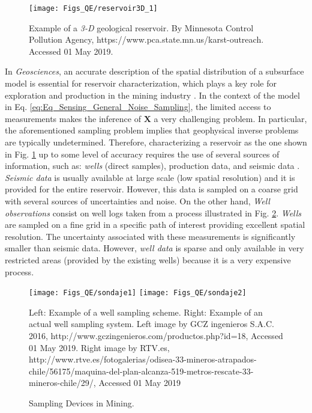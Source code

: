 		\begin{figure}[H]
		\centering
		\texttt{[image: Figs\_QE/reservoir3D\_1]}

		\caption[Example of a \emph{3-D} geological reservoir.]{Example of a \emph{3-D} geological reservoir. By Minnesota Control Pollution Agency, https://www.pca.state.mn.us/karst-outreach. Accessed 01 May 2019.}
		\label{fig:example3Dreservoir}
		\end{figure}
		
In \textit{Geosciences}, an accurate description of the spatial distribution of a subsurface model is essential for reservoir characterization, which plays a key role for %
exploration and production in the mining industry \citep{Oliver_2008_a,Onwunalu09,GuyagulerBaris2002_a,Bangerth_2005,Krause_2006,Bangerth_2006}. In the context of the model in Eq. \eqref{eq:Eq_Sensing_General_Noise_Sampling}, the limited access to measurements makes the inference of $\mathbf{X}$ a very challenging problem. In particular, the aforementioned sampling problem implies that geophysical inverse problems are typically undetermined. Therefore, characterizing a reservoir as the one shown in Fig. \ref{fig:example3Dreservoir} up to some level of accuracy requires the use of several sources of information, such as: \emph{wells} (direct samples), production data, and seismic data \citep{Oliver_2008_a,GuyagulerBaris2002_a,Krause_2008b,olea1984_a}. \emph{Seismic data} is usually available at large scale (low spatial resolution) and it is provided for the entire reservoir. However, this data is sampled on a coarse grid with several sources of uncertainties and noise. On the other hand, \emph{Well observations} consist on well logs taken from a process illustrated in Fig. \ref{fig:samplingWell}. \emph{Wells} are sampled on a fine grid in a specific path of interest providing excellent spatial resolution. The uncertainty associated with these measurements is significantly smaller than seismic data. However, \emph{well data} is sparse and only available in very restricted areas (provided by the existing wells) because it is a very expensive process. 


		\begin{figure}[H]
		\centering
		\texttt{[image: Figs\_QE/sondaje1]}
		\texttt{[image: Figs\_QE/sondaje2]}

		\caption[Sampling Devices in Mining.]{Sampling Devices in Mining.}
		\scriptsize{Left: Example of a well sampling scheme. Right: Example of an actual well sampling system. Left image by GCZ ingenieros S.A.C. 2016, http://www.gczingenieros.com/productos.php?id=18, Accessed 01 May 2019. Right image by RTV.es, http://www.rtve.es/fotogalerias/odisea-33-mineros-atrapados-chile/56175/maquina-del-plan-alcanza-519-metros-rescate-33-mineros-chile/29/, Accessed 01 May 2019}
		\label{fig:samplingWell}
		\end{figure}

